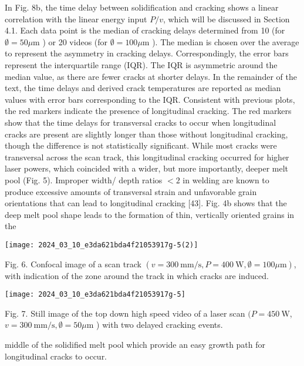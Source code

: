\documentclass[10pt]{article}
\begin{document}
In Fig. 8b, the time delay between solidification and cracking shows a linear correlation with the linear energy input $P / v$, which will be discussed in Section 4.1. Each data point is the median of cracking delays determined from 10 (for $\emptyset=50 \mu \mathrm{m}$ ) or 20 videos (for $\emptyset=100 \mu \mathrm{m}$ ). The median is chosen over the average to represent the asymmetry in cracking delays. Correspondingly, the error bars represent the interquartile range (IQR). The IQR is asymmetric around the median value, as there are fewer cracks at shorter delays. In the remainder of the text, the time delays and derived crack temperatures are reported as median values with error bars corresponding to the IQR. Consistent with previous plots, the red markers indicate the presence of longitudinal cracking. The red markers show that the time delays for transversal cracks to occur when longitudinal cracks are present are slightly longer than those without longitudinal cracking, though the difference is not statistically significant. While most cracks were transversal across the scan track, this longitudinal cracking occurred for higher laser powers, which coincided with a wider, but more importantly, deeper melt pool (Fig. 5). Improper width/ depth ratios $<2$ in welding are known to produce excessive amounts of transversal strain and unfavorable grain orientations that can lead to longitudinal cracking [43]. Fig. 4b shows that the deep melt pool shape leads to the formation of thin, vertically oriented grains in the

\begin{center}
\texttt{[image: 2024\_03\_10\_e3da621bda4f21053917g-5(2)]}
\end{center}

Fig. 6. Confocal image of a scan track $(v=300 \mathrm{~mm} / \mathrm{s}, P=400 \mathrm{~W}, \emptyset=100 \mu \mathrm{m})$, with indication of the zone around the track in which cracks are induced.

\begin{center}
\texttt{[image: 2024\_03\_10\_e3da621bda4f21053917g-5]}
\end{center}

Fig. 7. Still image of the top down high speed video of a laser scan $(P=450 \mathrm{~W}$, $v=300 \mathrm{~mm} / \mathrm{s}, \emptyset=50 \mu \mathrm{m}$ ) with two delayed cracking events.

middle of the solidified melt pool which provide an easy growth path for longitudinal cracks to occur.
\end{document}
